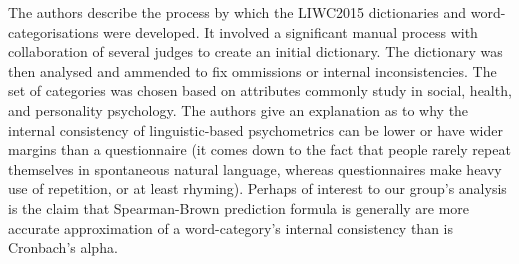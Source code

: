 The authors describe the process by which the LIWC2015 dictionaries and word-categorisations were developed. It involved a significant manual process with collaboration of several judges to create an initial dictionary. The dictionary was then analysed and ammended to fix ommissions or internal inconsistencies. The set of categories was chosen based on attributes commonly study in social, health, and personality psychology. The authors give an explanation as to why the internal consistency of linguistic-based psychometrics can be lower or have wider margins than a questionnaire (it comes down to the fact that people rarely repeat themselves in spontaneous natural language, whereas questionnaires make heavy use of repetition, or at least rhyming). Perhaps of interest to our group's analysis is the claim that Spearman-Brown prediction formula is generally are more accurate approximation of a word-category's internal consistency than is Cronbach's alpha.
